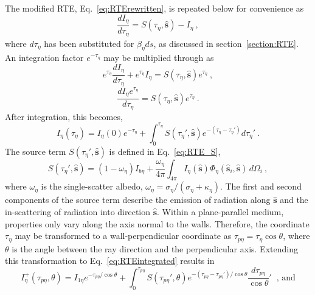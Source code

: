 The modified RTE, Eq.~\ref{eq:RTErewritten}, is repeated below for convenience as 
\begin{equation}
    \frac{dI_\eta{}}{d\tau{}_\eta} = S(\tau_\eta,\hat{\textbf{s}})-I_\eta{} ~,
    \label{eq:RTErepeated}
\end{equation}
where $d\tau_\eta$ has been substituted for $\beta_\eta{}ds$, as discussed in section~\ref{section:RTE}. An integration factor $e^{-\tau_\eta}$ may be multiplied through as  
\begin{equation}
    e^{\tau_\eta}\frac{dI_\eta{}}{d\tau{}_\eta} + e^{\tau_\eta}I_\eta= S(\tau_\eta,\hat{\textbf{s}})e^{\tau_\eta} ~,
\end{equation}
\begin{equation}
    \frac{dI_\eta{}e^{\tau_\eta}}{d\tau{}_\eta} = S(\tau_\eta,\hat{\textbf{s}})e^{\tau_\eta} \ .
\end{equation}
After integration, this becomes,
\begin{equation}
    I_\eta{}(\tau_\eta) = I_\eta{}(0)e^{-\tau_\eta} + \int_0^{\tau_\eta}{S(\tau_\eta',\hat{\textbf{s}})e^{-(\tau_\eta-\tau_\eta')}}d\tau_\eta' ~.
    \label{eq:RTEintegrated}
\end{equation}
The source term $S(\tau_\eta',\hat{\textbf{s}})$ is defined in Eq.~\ref{eq:RTE_S},
\begin{equation}
    S(\tau_\eta',\hat{\textbf{s}}) = (1-\omega{}_\eta{})I_{b\eta{}}+\frac{\omega{}_\eta{}}{4\pi}\int_{4\pi{}}{I_\eta{}(\hat{\textbf{s}})\Phi_\eta{}(\hat{\textbf{s}}_i,\hat{\textbf{s}})}\,d\Omega{}_i ~,
    \label{eq:RTE_S}
\end{equation}
where $\omega_\eta$ is the single-scatter albedo, $\omega_\eta=\sigma_\eta/(\sigma_\eta+\kappa_\eta)$. The first and second components of the source term describe the emission of radiation along $\hat{\textbf{s}}$ and the in-scattering of radiation into direction $\hat{\textbf{s}}$. Within a plane-parallel medium, properties only vary along the axis normal to the walls. Therefore, the coordinate $\tau{}_\eta{}$ may be transformed to a wall-perpendicular coordinate as $\tau{}_{p\eta{}}=\tau{}_\eta{}\cos{\theta}$, where $\theta$ is the angle between the ray direction and the perpendicular axis. Extending this transformation to Eq.~\ref{eq:RTEintegrated} results in
\begin{equation}
    I^+_\eta{}(\tau_{p\eta},\theta) = I_{1\eta{}}e^{-\tau_{p\eta}/\cos{\theta}} + \int_0^{\tau_{p\eta}}{S(\tau_{p\eta}',\theta)e^{-(\tau_{p\eta}-\tau_{p\eta}')/\cos{\theta}}}\frac{d\tau_{p\eta}}{\cos{\theta}}' \ \text{ , and}
    \label{eq:RTEplus}
\end{equation}
